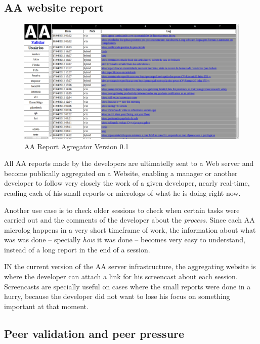 \documentclass{article}
\begin{document}
\subsection{AA website report}

\begin{figure}
\begin{center}
   \includegraphics[width=\linewidth]{figs/aa-0_1.png}
\end{center}
   \caption{AA Report Agregator Version 0.1}
\label{fig:aaserver}
\end{figure}

All AA reports made by the developers are ultimatelly sent to a Web server and
become publically aggregated on a Website, enabling a manager or another
developer to follow very closely the work of a given developer, nearly real-time,
reading each of his small reports or micrologs of what he is doing right now.

Another use case is to check older sessions to check when certain tasks
were carried out and the comments of the developer about the \emph{process}.
Since each AA microlog happens in a very short timeframe of work, the information
about what was was done -- specially \emph{how} it was done -- becomes very easy to
understand, instead of a long report in the end of a session.

IN the current version of the AA server infrastructure, the aggregating
website is where the developer can attach a link for his
screencast about each session. Screencasts are specially useful on cases where
the small reports were done in a hurry, because the developer did not want to
lose his focus on something important at that moment.

\subsection{Peer validation and peer pressure}
\end{document}
